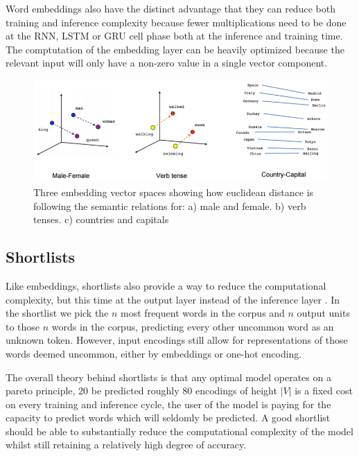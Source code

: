 \documentclass[a4paper]{article}
\begin{document}
Word embeddings also have the distinct advantage that they can reduce both training
and inference complexity because fewer multiplications need to be done at
the RNN, LSTM or GRU cell phase both at the inference and training time. The
comptutation of the embedding layer can be heavily optimized because the relevant
input will only have a non-zero value in a single vector component.

\begin{figure}[!ht]
\includegraphics[width=\textwidth]{01}
\centering
\caption{Three embedding vector spaces showing how euclidean distance is following the semantic relations for: a) male and female. b) verb tenses. c) countries and capitals }
\end{figure}

\subsection{Shortlists}
\label{sec:shortlists}

Like embeddings, shortlists also provide a way to reduce the computational
complexity, but this time at the output layer instead of the inference layer
\cite{schwenk05}. In the shortlist we pick the $n$ most frequent words in the
corpus and $n$ output units to those $n$ words in the corpus, predicting every
other uncommon word as an unknown token. However, input encodings still
allow for representations of those words deemed uncommon, either by
embeddings or one-hot encoding.

The overall theory behind shortlists is that any optimal model operates
on a pareto principle, 20%
be predicted roughly 80%
encodings of height $|V|$ is a fixed cost on every training and inference
cycle, the user of the model is paying for the capacity to predict words which
will seldomly be predicted. A good shortlist should be able to substantially
reduce the computational complexity of the model whilst still retaining a
relatively high degree of accuracy.
\end{document}
